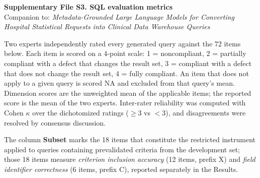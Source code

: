 \documentclass[10pt]{article}
\begin{document}
\begin{center}
{\large\bfseries Supplementary File S3. SQL evaluation metrics}\\[2pt]
{\footnotesize Companion to: \emph{Metadata-Grounded Large Language Models for Converting Hospital Statistical
Requests into Clinical Data Warehouse Queries}}
\end{center}

\vspace{6pt}
\noindent
Two experts independently rated every generated query against the 72 items
below. Each item is scored on a 4-point scale: 1 = noncompliant, 2 = partially
compliant with a defect that changes the result set, 3 = compliant with a defect
that does not change the result set, 4 = fully compliant. An item that does not
apply to a given query is scored NA and excluded from that query's mean.
Dimension scores are the unweighted mean of the applicable items; the reported
score is the mean of the two experts. Inter-rater reliability was computed with
Cohen $\kappa$ over the dichotomized ratings ($\ge$3 vs $<$3), and disagreements
were resolved by consensus discussion.

\vspace{4pt}
\noindent
The column \textbf{Subset} marks the 18 items that constitute the restricted
instrument applied to queries containing prevalidated criteria from the
development set; those 18 items measure \emph{criterion inclusion accuracy}
(12 items, prefix X) and \emph{field identifier correctness} (6 items,
prefix C), reported separately in the Results.
\end{document}
